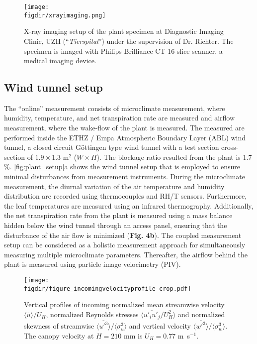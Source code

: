 \begin{figure}[t]
	\centering
	\texttt{[image: \\figdir/xrayimaging.png]}
	\caption{X-ray imaging setup of the plant specimen at Diagnostic Imaging Clinic, UZH (``\textit{Tierspital}'') under the supervision of Dr. Richter. The specimen is imaged with Philips Brilliance CT 16-slice scanner, a medical imaging device.}
	\label{fig:xrayimaging}
\end{figure}


\subsection{Wind tunnel setup}
\label{subsec:windtunnelsetup}

The “online” measurement consists of microclimate measurement, where humidity, temperature, and net transpiration rate are measured and airflow measurement, where the wake-flow of the plant is measured. The measured are performed inside the ETHZ / Empa Atmospheric Boundary Layer (ABL) wind tunnel, a closed circuit Göttingen type wind tunnel with a test section cross-section of $1.9\times1.3$ m$^2$ ($W\times H$). The blockage ratio resulted from the plant is $1.7$\%. \cref{fig:plant_setup}a shows the wind tunnel setup that is employed to ensure minimal disturbances from measurement instruments. During the microclimate measurement, the diurnal variation of the air temperature and humidity distribution are recorded using thermocouples and RH/T sensors. Furthermore, the leaf temperatures are measured using an infrared thermography. Additionally, the net transpiration rate from the plant is measured using a mass balance hidden below the wind tunnel through an access panel, ensuring that the disturbance of the air flow is minimized  (\textbf{Fig. 4b}). The coupled measurement setup can be considered as a holistic measurement approach for simultaneously measuring multiple microclimate parameters. Thereafter, the airflow behind the plant is measured using particle image velocimetry (PIV).
	
	\begin{figure}[p]
		\centering
		\texttt{[image: \\figdir/figure\_incomingvelocityprofile-crop.pdf]}
		\caption{Vertical profiles of incoming  normalized mean streamwise velocity $\langle \overline{u} \rangle / U_H$,  normalized Reynolds stresses $\langle \overline{u'_i u'_j}/U_H^2 \rangle$ and  normalized skewness of streamwise $\langle \overline{u'^3} \rangle / \langle \sigma_{u}^3 \rangle$ and vertical velocity $\langle \overline{w'^3} \rangle / \langle \sigma_{w}^3 \rangle$. The canopy velocity at $H=210$ mm is $U_H = 0.77$ m~s$^{-1}$.}
		\label{fig:incomingvelocityprofile}
	\end{figure}

